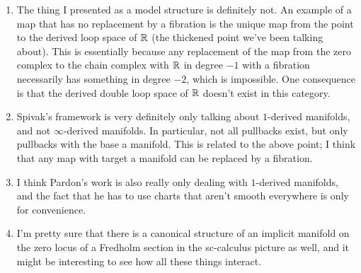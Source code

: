 \begin{enumerate}

\item The thing I presented as a model structure is definitely not. An example of a map that has no replacement by a fibration is the unique map from the point to the derived loop space of $\mathbb R$ (the thickened point we've been talking about). This is essentially because any replacement of the map from the zero complex to the chain complex with $\mathbb R$ in degree $-1$ with a fibration necessarily has something in degree $-2$, which is impossible. One consequence is that the derived double loop space of $\mathbb R$ doesn't exist in this category.

\item Spivak's framework is very definitely only talking about $1$-derived manifolds, and not $\infty$-derived manifolds. In particular, not all pullbacks exist, but only pullbacks with the base a manifold. This is related to the above point; I think that any map with target a manifold can be replaced by a fibration.

\item I think Pardon's work is also really only dealing with $1$-derived manifolds, and the fact that he has to use charts that aren't smooth everywhere is only for convenience.

\item I'm pretty sure that there is a canonical structure of an implicit manifold on the zero locus of a Fredholm section in the sc-calculus picture as well, and it might be interesting to see how all these things interact.

\end{enumerate}

